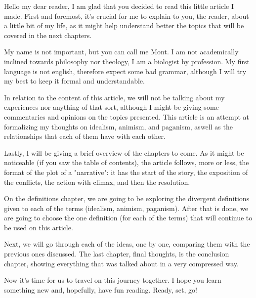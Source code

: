Hello my dear reader, I am glad that you decided to read this little article I made.
First and foremost, it's crucial for me to explain to you, the reader, about a little bit
of my life, as it might help understand better the topics that will be covered in the next
chapters.

My name is not important, but you can call me Mont. I am not academically inclined towards
philosophy nor theology, I am a biologist by profession. My first language is not english,
therefore expect some bad grammar, although I will try my best to keep it formal and understandable.

In relation to the content of this article, we will not be talking about my experiences nor anything of
that sort, although I might be giving some commentaries and opinions on the topics presented. This
article is an attempt at formalizing my thoughts on idealism, animism, and paganism, aswell as the
relationships that each of them have with each other.

Lastly, I will be giving a brief overview of the chapters to come. As it might be noticeable (if you saw
the table of contents), the article follows, more or less, the format of the plot of a "narrative": it has
the start of the story, the exposition of the conflicts, the action with climax, and then the resolution.

On the definitions chapter, we are going to be exploring the divergent definitions given to each of
the terms (idealism, animism, paganism). After that is done, we are going to choose the one definition
(for each of the terms) that will continue to be used on this article.

Next, we will go through each of the ideas, one by one, comparing them with the previous ones discussed.
The last chapter, final thoughts, is the conclusion chapter, showing everything that was talked
about in a very compressed way.

Now it's time for us to travel on this journey together. I hope you learn something new and, hopefully,
have fun reading. Ready, set, go!